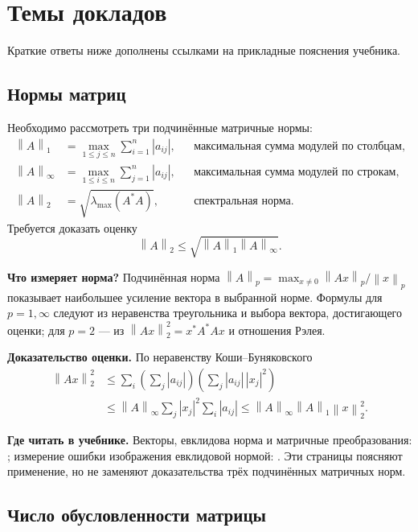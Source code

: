 \documentclass[12pt,a4paper]{article}
\theoremstyle{definition}
\theoremstyle{remark}
\newcommand{\norm}[1]{\left\lVert #1\right\rVert}
\begin{document}
\section{Темы докладов}

Краткие ответы ниже дополнены ссылками на прикладные пояснения учебника.

\subsection{Нормы матриц}

Необходимо рассмотреть три подчинённые матричные нормы:
\begin{align*}
  \norm{A}_1
    &=\max_{1\leqslant j\leqslant n}\sum_{i=1}^{n}|a_{ij}|,
    &&\text{максимальная сумма модулей по столбцам},\\
  \norm{A}_{\infty}
    &=\max_{1\leqslant i\leqslant n}\sum_{j=1}^{n}|a_{ij}|,
    &&\text{максимальная сумма модулей по строкам},\\
  \norm{A}_2
    &=\sqrt{\lambda_{\max}(A^*A)},
    &&\text{спектральная норма}.
\end{align*}
Требуется доказать оценку
\[
  \boxed{\norm{A}_2\leqslant
  \sqrt{\norm{A}_1\norm{A}_{\infty}}}.
\]

\textbf{Что измеряет норма?}
Подчинённая норма $\norm{A}_p=\max_{x\ne0}\norm{Ax}_p/\norm{x}_p$
показывает наибольшее усиление вектора в выбранной норме.
Формулы для $p=1,\infty$ следуют из неравенства треугольника
и выбора вектора, достигающего оценки; для $p=2$ ---
из $\norm{Ax}_2^2=x^*A^*Ax$ и отношения Рэлея.

\textbf{Доказательство оценки.}
По неравенству Коши--Буняковского
\[
 \begin{aligned}
  \norm{Ax}_2^2
  &\leqslant\sum_i
    \left(\sum_j|a_{ij}|\right)
    \left(\sum_j|a_{ij}|\,|x_j|^2\right)\\
  &\leqslant\norm{A}_\infty
    \sum_j|x_j|^2\sum_i|a_{ij}|
  \leqslant\norm{A}_\infty\norm{A}_1\norm{x}_2^2.
 \end{aligned}
\]

\textbf{Где читать в учебнике.}
Векторы, евклидова норма и матричные преобразования:
\cite[\S\,2.6.6, с.~129--130]{GW2012};
измерение ошибки изображения евклидовой нормой:
\cite[\S\,5.9, с.~419--420]{GW2012}.
Эти страницы поясняют применение, но не заменяют доказательства
трёх подчинённых матричных норм.

\subsection{Число обусловленности матрицы}
\end{document}
